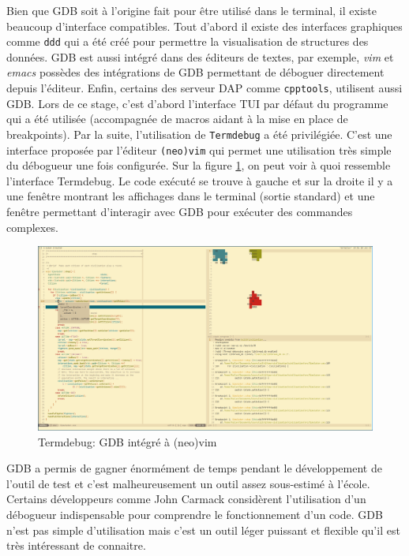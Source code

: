 \documentclass[a4paper]{article}
\begin{document}
Bien que GDB soit à l'origine fait pour être utilisé dans le terminal, il existe
beaucoup d'interface compatibles. Tout d'abord il existe des interfaces
graphiques comme \verb|ddd| qui a été créé pour permettre la visualisation de
structures des données. GDB est aussi intégré dans des éditeurs de textes, par
exemple, \textit{vim} et \textit{emacs} possèdes des intégrations de GDB
permettant de déboguer directement depuis l'éditeur. Enfin, certains des serveur
DAP comme \verb|cpptools|, utilisent aussi GDB. Lors de ce stage, c'est d'abord
l'interface TUI par défaut du programme qui a été utilisée (accompagnée de
macros aidant à la mise en place de breakpoints). Par la suite, l'utilisation de
\verb|Termdebug| a été privilégiée. C'est une interface proposée par l'éditeur
\verb|(neo)vim| qui permet une utilisation très simple du débogueur une fois
configurée. Sur la figure \ref{fig:termdebug}, on peut voir à quoi ressemble
l'interface Termdebug. Le code exécuté se trouve à gauche et sur la droite il y
a une fenêtre montrant les affichages dans le terminal (sortie standard) et une
fenêtre permettant d'interagir avec GDB pour exécuter des commandes complexes.

\begin{figure}[h!]
  \begin{center}
  \includegraphics[scale=0.2]{./img/termdebug.png}
    \caption{Termdebug: GDB intégré à (neo)vim}
  \end{center}
  \label{fig:termdebug}
\end{figure}

GDB a permis de gagner énormément de temps pendant le développement de l'outil
de test et c'est malheureusement un outil assez sous-estimé à l'école. Certains
développeurs comme John Carmack considèrent l'utilisation d'un débogueur
indispensable pour comprendre le fonctionnement d'un code. GDB n'est pas simple
d'utilisation mais c'est un outil léger puissant et flexible qu'il est très
intéressant de connaitre.
\end{document}
